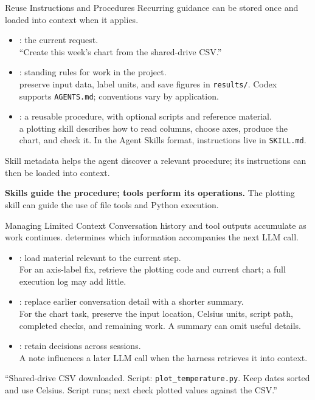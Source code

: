 \begin{frame}{Reuse Instructions and Procedures}
\small
Recurring guidance can be stored once and loaded into context when it applies.
\begin{itemize}
\setlength{\itemsep}{2mm}
\item {}: the current request.\\
 ``Create this week's chart from the shared-drive CSV.''
\item {}: standing rules for work in the project.\\
 preserve input data, label units, and save figures in \texttt{results/}. Codex supports \texttt{AGENTS.md}; conventions vary by application.
\item {}: a reusable procedure, with optional scripts and reference material.\\
 a plotting skill describes how to read columns, choose axes, produce the chart, and check it. In the Agent Skills format, instructions live in \texttt{SKILL.md}.
\end{itemize}
\par\smallskip
Skill metadata helps the agent discover a relevant procedure; its instructions can then be loaded into context.
\par\smallskip
\textbf{Skills guide the procedure; tools perform its operations.} The plotting skill can guide the use of file tools and Python execution.
\end{frame}

\begin{frame}{Managing Limited Context}
\small
Conversation history and tool outputs accumulate as work continues.  determines which information accompanies the next LLM call.
\begin{itemize}
\setlength{\itemsep}{2mm}
\item {}: load material relevant to the current step.\\
For an axis-label fix, retrieve the plotting code and current chart; a full execution log may add little.
\item {}: replace earlier conversation detail with a shorter summary.\\
For the chart task, preserve the input location, Celsius units, script path, completed checks, and remaining work. A summary can omit useful details.
\item {}: retain decisions across sessions.\\
A note influences a later LLM call when the harness retrieves it into context.
\end{itemize}
\par\smallskip
{}\par
``Shared-drive CSV downloaded. Script: \texttt{plot\_temperature.py}. Keep dates sorted and use Celsius. Script runs; next check plotted values against the CSV.''
\end{frame}

